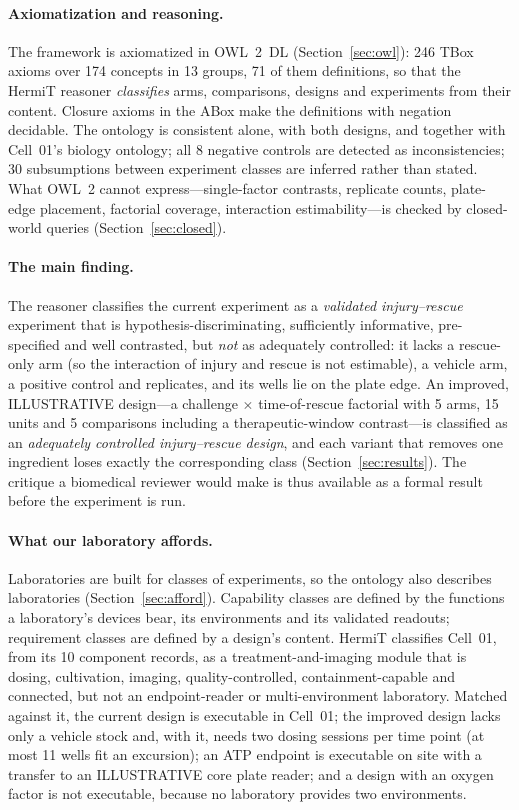 \documentclass[10pt,a4paper]{article}
\begin{document}
\paragraph{Axiomatization and reasoning.} The framework is axiomatized in OWL~2~DL (Section~\ref{sec:owl}):
246 TBox axioms over 174 concepts in 13 groups, 71 of them definitions, so that the HermiT
reasoner \emph{classifies} arms, comparisons, designs and experiments from their content. Closure axioms in the ABox
make the definitions with negation decidable. The ontology is consistent alone, with both designs, and together with
Cell~01's biology ontology; all 8 negative controls are detected as inconsistencies; 30 subsumptions
between experiment classes are inferred rather than stated. What OWL~2 cannot express---single-factor contrasts,
replicate counts, plate-edge placement, factorial coverage, interaction estimability---is checked by closed-world
queries (Section~\ref{sec:closed}).

\paragraph{The main finding.} The reasoner classifies the current experiment as a \emph{validated injury--rescue}
experiment that is hypothesis-discriminating, sufficiently informative, pre-specified and well contrasted, but
\emph{not} as adequately controlled: it lacks a rescue-only arm (so the interaction of injury and rescue is not
estimable), a vehicle arm, a positive control and replicates, and its wells lie on the plate edge. An improved,
ILLUSTRATIVE design---a challenge $\times$ time-of-rescue factorial with 5 arms, 15 units and
5 comparisons including a therapeutic-window contrast---is classified as an
\emph{adequately controlled injury--rescue design}, and each variant that removes one ingredient loses exactly the
corresponding class (Section~\ref{sec:results}). The critique a biomedical reviewer would make is thus available as
a formal result before the experiment is run.

\paragraph{What our laboratory affords.} Laboratories are built for classes of experiments, so the ontology also
describes laboratories (Section~\ref{sec:afford}). Capability classes are defined by the functions a laboratory's
devices bear, its environments and its validated readouts; requirement classes are defined by a design's content.
HermiT classifies Cell~01, from its 10 component records, as a treatment-and-imaging module that is dosing,
cultivation, imaging, quality-controlled, containment-capable and connected, but not an endpoint-reader or
multi-environment laboratory. Matched against it, the current design is executable in Cell~01; the improved design
lacks only a vehicle stock and, with it, needs two dosing sessions per time point (at most 11 wells fit an
excursion); an ATP endpoint is executable on site with a transfer to an ILLUSTRATIVE core plate reader; and a design
with an oxygen factor is not executable, because no laboratory provides two environments.
\end{document}
